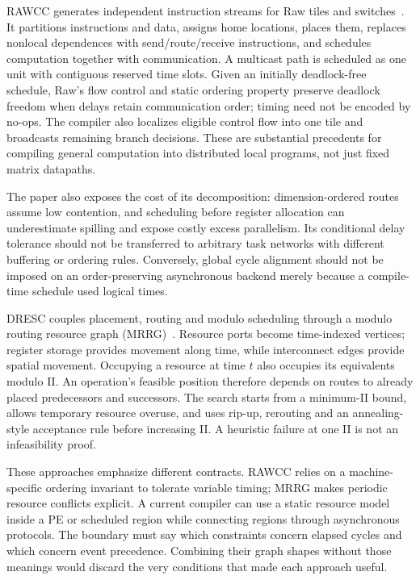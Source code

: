 \documentclass[final,3p,times,authoryear]{elsarticle}
\begin{document}
RAWCC generates independent instruction streams for Raw tiles and switches~\citep{raw1998}. It partitions instructions and data, assigns home locations, places them, replaces nonlocal dependences with send/route/receive instructions, and schedules computation together with communication. A multicast path is scheduled as one unit with contiguous reserved time slots. Given an initially deadlock-free schedule, Raw's flow control and static ordering property preserve deadlock freedom when delays retain communication order; timing need not be encoded by no-ops. The compiler also localizes eligible control flow into one tile and broadcasts remaining branch decisions. These are substantial precedents for compiling general computation into distributed local programs, not just fixed matrix datapaths.

The paper also exposes the cost of its decomposition: dimension-ordered routes assume low contention, and scheduling before register allocation can underestimate spilling and expose costly excess parallelism. Its conditional delay tolerance should not be transferred to arbitrary task networks with different buffering or ordering rules. Conversely, global cycle alignment should not be imposed on an order-preserving asynchronous backend merely because a compile-time schedule used logical times.

DRESC couples placement, routing and modulo scheduling through a modulo routing resource graph (MRRG)~\citep{mei2003}. Resource ports become time-indexed vertices; register storage provides movement along time, while interconnect edges provide spatial movement. Occupying a resource at time $t$ also occupies its equivalents modulo II. An operation's feasible position therefore depends on routes to already placed predecessors and successors. The search starts from a minimum-II bound, allows temporary resource overuse, and uses rip-up, rerouting and an annealing-style acceptance rule before increasing II. A heuristic failure at one II is not an infeasibility proof.

These approaches emphasize different contracts. RAWCC relies on a machine-specific ordering invariant to tolerate variable timing; MRRG makes periodic resource conflicts explicit. A current compiler can use a static resource model inside a PE or scheduled region while connecting regions through asynchronous protocols. The boundary must say which constraints concern elapsed cycles and which concern event precedence. Combining their graph shapes without those meanings would discard the very conditions that made each approach useful.
\end{document}
